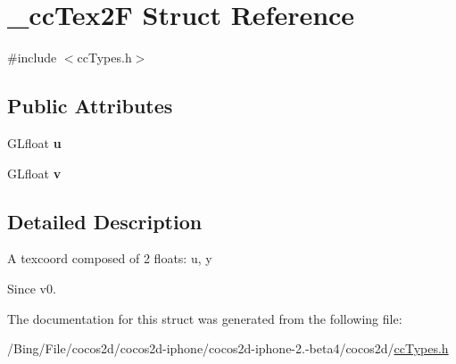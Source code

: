 \hypertarget{struct__cc_tex2_f}{\section{\-\_\-cc\-Tex2\-F Struct Reference}
\label{struct__cc_tex2_f}
}


{\ttfamily \#include $<$cc\-Types.\-h$>$}

\subsection*{Public Attributes}
\begin{DoxyCompactItemize}
\item 
\hypertarget{struct__cc_tex2_f_aa17e0fbd06953bbc01899e09615779b4}{G\-Lfloat {\bfseries u}}\label{struct__cc_tex2_f_aa17e0fbd06953bbc01899e09615779b4}

\item 
\hypertarget{struct__cc_tex2_f_af255ba5c7a2aa85dccc38a487f1d8c8b}{G\-Lfloat {\bfseries v}}\label{struct__cc_tex2_f_af255ba5c7a2aa85dccc38a487f1d8c8b}

\end{DoxyCompactItemize}


\subsection{Detailed Description}
A texcoord composed of 2 floats\-: u, y \begin{DoxySince}{Since}
v0. 
\end{DoxySince}


The documentation for this struct was generated from the following file\-:\begin{DoxyCompactItemize}
\item 
/\-Bing/\-File/cocos2d/cocos2d-\/iphone/cocos2d-\/iphone-\/2.-\/beta4/cocos2d/\hyperlink{cc_types_8h}{cc\-Types.\-h}\end{DoxyCompactItemize}
